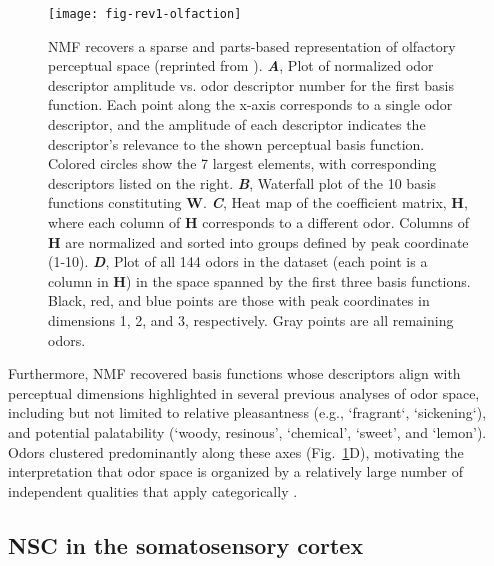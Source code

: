 \begin{figure}[ht]
	\centering
	\texttt{[image: fig-rev1-olfaction]}
    \caption{\ac{NMF} recovers a sparse and parts-based representation
    of olfactory perceptual space (reprinted from \cite{Castro2013}).
       \textbf{\emph{A}},
          Plot of normalized odor descriptor amplitude vs. odor descriptor number for
          the first basis function. Each point along the x-axis corresponds to a single
          odor descriptor, and the amplitude of each descriptor indicates the
          descriptor's relevance to the shown perceptual basis function.
          Colored circles show the 7 largest elements, with corresponding descriptors
          listed on the right.
       \textbf{\emph{B}},
          Waterfall plot of the 10 basis functions constituting \textbf{W}.
       \textbf{\emph{C}},
          Heat map of the coefficient matrix, \textbf{H},
          where each column of \textbf{H} corresponds to a different odor.
          Columns of \textbf{H} are normalized and sorted into groups defined by
          peak coordinate (1-10).
       \textbf{\emph{D}},
          Plot of all 144 odors in the dataset (each point is a column in \textbf{H})
          in the space spanned by the first three basis functions.
          Black, red, and blue points are those with peak coordinates in dimensions
          1, 2, and 3, respectively. Gray points are all remaining odors.}
	\label{fig:evidence-olfaction}
\end{figure}

Furthermore, \ac{NMF} recovered basis functions whose descriptors align
with perceptual dimensions highlighted in several previous analyses of odor space,
including but not limited to relative pleasantness (e.g., `fragrant`, `sickening`), 
and potential palatability (`woody, resinous', `chemical', `sweet', and `lemon').
Odors clustered predominantly along these axes
(Fig.~\ref{fig:evidence-olfaction}D), 
motivating the interpretation that odor space is organized 
by a relatively large number of independent qualities that apply categorically
\cite{Castro2013}.


\subsection*{NSC in the somatosensory cortex}

